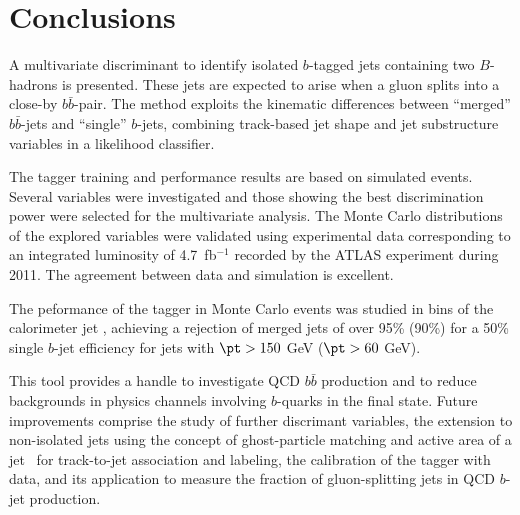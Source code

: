 %
%
\chapter{Conclusions}

A multivariate discriminant to identify isolated $b$-tagged jets containing two $B$-hadrons is presented. These jets are expected to arise when a gluon splits into a close-by $b\bar{b}$-pair. The method exploits the kinematic differences between ``merged'' $b\bar{b}$-jets and ``single'' $b$-jets, combining track-based jet shape and jet substructure variables in a likelihood classifier.

The tagger training and performance results are based on simulated events. Several variables were investigated and those showing the best discrimination power were selected for the multivariate analysis. The Monte Carlo distributions of the explored variables were validated using experimental data corresponding to an integrated luminosity of 4.7~fb$^{-1}$ recorded by the ATLAS experiment during 2011. The agreement between data and simulation is excellent. 

 The peformance of the tagger in Monte Carlo events was studied in bins of the calorimeter jet \pt, achieving a rejection of merged jets of over 95\% (90\%) for a 50\% single $b$-jet efficiency for jets with $\pt>150$ GeV ($\pt>60$ GeV).


This tool provides a handle to investigate QCD $b\bar{b}$ production and to reduce backgrounds in physics channels involving $b$-quarks in the final state.  Future improvements comprise the study of further discrimant variables, the extension to non-isolated jets using the concept of ghost-particle matching and active area of a jet~\cite{CatchmentArea} for track-to-jet association and labeling, the calibration of the tagger with data, and its application to measure the fraction of gluon-splitting jets in QCD $b$-jet production.







